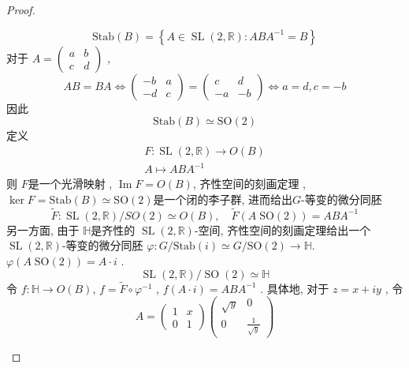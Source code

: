 \documentclass[../main.tex]{subfiles}
\begin{document}
\begin{proof}
\begin{enumerate}
    \[
    \mathrm{Stab}\left( B \right)= \left\{ A\in \operatorname{SL}\left( 2,\mathbb{R}  \right): ABA^{-1} = B  \right\} 
    \] 对于 \(  A= \begin{pmatrix} 
        a&b\\ 
         c&d 
    \end{pmatrix}   \) , \[
    AB= BA\iff \begin{pmatrix} 
        -b&a\\ 
         -d&c 
    \end{pmatrix}= \begin{pmatrix} 
        c&d\\ 
         -a&-b 
    \end{pmatrix}  \iff a= d, c= -b
    \]因此 \[
    \mathrm{Stab}\left( B \right)\simeq \mathrm{SO}\left( 2 \right)  
    \]定义 \[
    \begin{aligned}
    F: \operatorname{SL}\left( 2,\mathbb{R}  \right)\to  O\left( B \right) \\ 
     A\mapsto  ABA^{-1}    
    \end{aligned}
    \]则 \(  F  \)是一个光滑映射 , \(  \operatorname{Im}F= O\left( B \right)   \), 齐性空间的刻画定理 ,  \(  \operatorname{ker}F  = \mathrm{Stab}\left( B \right)\simeq \mathrm{SO}\left( 2 \right)  \)是一个闭的李子群, 进而给出\(  G  \)-等变的微分同胚   \[
   \tilde{F}: \operatorname{SL}\left( 2,\mathbb{R}  \right) /SO\left( 2 \right) \simeq   O\left( B \right)  ,\quad \tilde{F}\left( A \; \mathrm{SO}\left( 2 \right)  \right)= ABA^{-1}  
    \]
    另一方面, 由于 \(  \mathbb{H}  \)是齐性的 \(  \operatorname{SL}\left( 2,\mathbb{R}  \right)   \)-空间,   齐性空间的刻画定理给出一个 \(  \operatorname{SL}\left( 2,\mathbb{R}  \right)   \)-等变的微分同胚 \(   \varphi : G/\mathrm{Stab}\left( i \right)\simeq G/\mathrm{SO}\left( 2 \right)\to \mathbb{H}    \). \(   \varphi \left( A\; \mathrm{SO}\left( 2 \right)  \right)= A \cdot i   \)   .
    \[
    \operatorname{SL}\left( 2,\mathbb{R}  \right)/ \operatorname{SO}\left( 2 \right)\simeq   \mathbb{H}
    \]令 \(  f: \mathbb{H}\to O\left( B \right)   \), \(  f=  \tilde{F}\circ \varphi ^{-1}   \)   , \(  f\left( A\cdot i \right)= ABA^{-1}    \) . 具体地, 对于 \(  z= x+ iy  \) , 令  \[
    A= \begin{pmatrix} 
        1&x\\ 
         0&1 
    \end{pmatrix}\begin{pmatrix} 
        \sqrt{y}&0\\ 
         0&\frac{1 }{\sqrt{y} }  
    \end{pmatrix}  
\]
\end{enumerate}
\end{proof}
\end{document}
